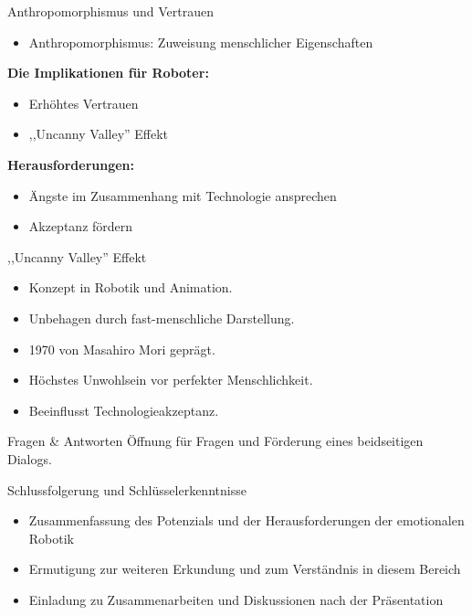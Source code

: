 \documentclass[aspectratio=169]{beamer}
\begin{document}
\begin{frame}{Anthropomorphismus und Vertrauen}
  \begin{itemize}
      \item Anthropomorphismus: Zuweisung menschlicher Eigenschaften
  \end{itemize}
  \textbf{Die Implikationen für Roboter:}
  \begin{itemize}
      \item Erhöhtes Vertrauen
      \item ,,Uncanny Valley'' Effekt
  \end{itemize}
  \textbf{Herausforderungen:}
  \begin{itemize}
      \item Ängste im Zusammenhang mit Technologie ansprechen
      \item Akzeptanz fördern
  \end{itemize}
\end{frame}

\begin{frame}{,,Uncanny Valley'' Effekt}
  \begin{itemize}
      \item Konzept in Robotik und Animation.
      \item Unbehagen durch fast-menschliche Darstellung.
      \item 1970 von Masahiro Mori geprägt.
      \item Höchstes Unwohlsein vor perfekter Menschlichkeit.
      \item Beeinflusst Technologieakzeptanz.
  \end{itemize}
\end{frame}

\begin{frame}{Fragen \& Antworten}
  Öffnung für Fragen und Förderung eines beidseitigen Dialogs.
\end{frame}

\begin{frame}{Schlussfolgerung und Schlüsselerkenntnisse}
  \begin{itemize}
      \item Zusammenfassung des Potenzials und der Herausforderungen der emotionalen Robotik
      \item Ermutigung zur weiteren Erkundung und zum Verständnis in diesem Bereich
      \item Einladung zu Zusammenarbeiten und Diskussionen nach der Präsentation
  \end{itemize}
\end{frame}
\end{document}
